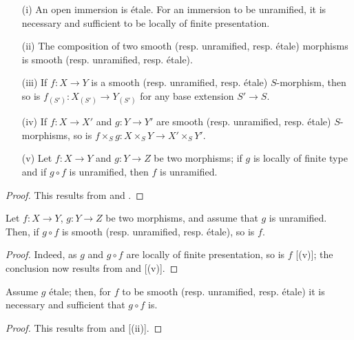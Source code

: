 \begin{proposition}[17.3.3]
\label{IV.17.3.3}
\begin{enumerate}
\item[(i)] An open immersion is \'etale. For an immersion to be unramified, it is necessary and sufficient to be locally of finite presentation.
\item[(ii)] The composition of two smooth (resp. unramified, resp. \'etale) morphisms is smooth (resp. unramified, resp. \'etale).
\item[(iii)] If $f : X \to Y$ is a smooth (resp. unramified, resp. \'etale) $S$-morphism, then so is $f_{(S')}: X_{(S')} \to Y_{(S')}$ for any base extension $S' \to S$. 
\item[(iv)] If $f : X \to X'$ and $g: Y \to Y'$ are smooth (resp. unramified, resp. \'etale) $S$-morphisms, so is $f \times_S g : X \times_S Y \to X' \times_S Y'$.
\item[(v)] Let $f: X \to Y$ and $g: Y \to Z$ be two morphisms; if $g$ is locally of finite type and if $g \circ f$ is unramified, then $f$ is unramified.
\end{enumerate}
\end{proposition}

\begin{proof}
This results from  and .
\end{proof}

\begin{proposition}[17.3.4]
\label{IV.17.3.4}
Let $f: X \to Y$, $g: Y \to Z$ be two morphisms, and assume that $g$ is unramified.
Then, if $g \circ f$ is smooth (resp. unramified, resp. \'etale), so is $f$.
\end{proposition}

\begin{proof}
Indeed, as $g$ and $g \circ f$ are locally of finite presentation, so is $f$ [(v)]; the conclusion now results from  and [(v)].
\end{proof}

\begin{corollary}[17.3.5]
\label{IV.17.3.5}
Assume $g$ \'etale; then, for $f$ to be smooth (resp. unramified, resp. \'etale) it is necessary and sufficient that $g \circ f$ is.
\end{corollary}

\begin{proof}
This results from  and [(ii)].
\end{proof}

